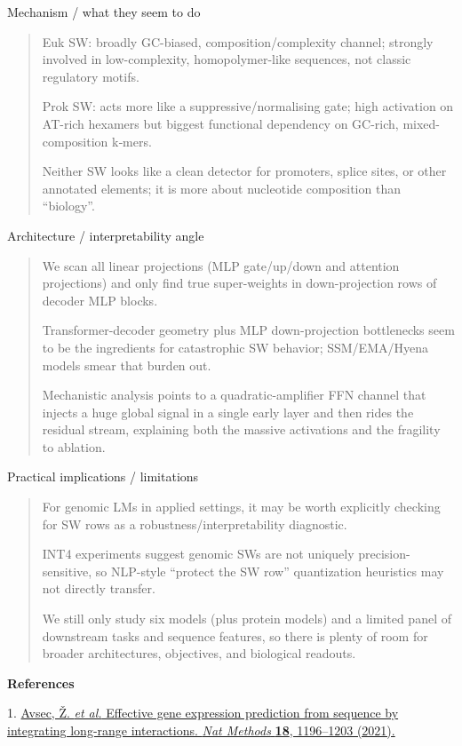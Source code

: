 \documentclass[11pt]{article}
\begin{document}
Mechanism / what they seem to do

\begin{quote}
Euk SW: broadly GC-biased, composition/complexity channel; strongly
involved in low-complexity, homopolymer-like sequences, not classic
regulatory motifs.

Prok SW: acts more like a suppressive/normalising gate; high activation
on AT-rich hexamers but biggest functional dependency on GC-rich,
mixed-composition k‑mers.

Neither SW looks like a clean detector for promoters, splice sites, or
other annotated elements; it is more about nucleotide composition than
``biology''.
\end{quote}

Architecture / interpretability angle

\begin{quote}
We scan all linear projections (MLP gate/up/down and attention
projections) and only find true super-weights in down-projection rows of
decoder MLP blocks.

Transformer-decoder geometry plus MLP down-projection bottlenecks seem
to be the ingredients for catastrophic SW behavior; SSM/EMA/Hyena models
smear that burden out.

Mechanistic analysis points to a quadratic-amplifier FFN channel that
injects a huge global signal in a single early layer and then rides the
residual stream, explaining both the massive activations and the
fragility to ablation.
\end{quote}

Practical implications / limitations

\begin{quote}
For genomic LMs in applied settings, it may be worth explicitly checking
for SW rows as a robustness/interpretability diagnostic.

INT4 experiments suggest genomic SWs are not uniquely
precision-sensitive, so NLP-style ``protect the SW row'' quantization
heuristics may not directly transfer.

We still only study six models (plus protein models) and a limited panel
of downstream tasks and sequence features, so there is plenty of room
for broader architectures, objectives, and biological readouts.
\end{quote}

\textbf{References}

1. \href{http://paperpile.com/b/FLFbSd/Fbg9}{Avsec, Ž. \emph{et al.}
Effective gene expression prediction from sequence by integrating
long-range interactions. \emph{Nat Methods} \textbf{18}, 1196--1203
(2021).}
\end{document}
